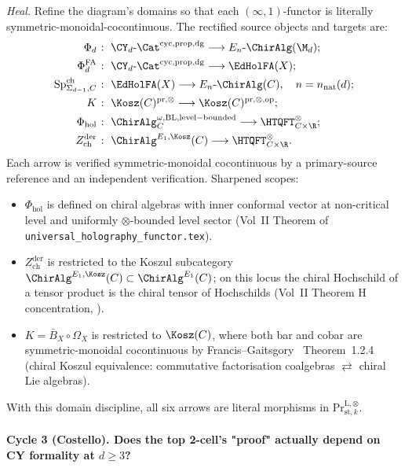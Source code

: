 \emph{Heal.} Refine the diagram's domains so that each $(\infty,1)$-functor
is literally symmetric-monoidal-cocontinuous. The rectified source
objects and targets are:
\begin{align*}
 \Phi_d &\;\colon\; \CY_d\text{-}\Cat^{\mathrm{cyc,prop,dg}}
 \longrightarrow E_n\text{-}\ChirAlg(\M_d); \\
 \Phi^{\mathrm{FA}}_d &\;\colon\; \CY_d\text{-}\Cat^{\mathrm{cyc,prop,dg}}
 \longrightarrow \EdHolFA(X); \\
 \mathrm{Sp}^{\mathrm{ch}}_{\Sigma_{d-1},C} &\;\colon\; \EdHolFA(X)
 \longrightarrow E_n\text{-}\ChirAlg(C), \quad n = n_{\mathrm{nat}}(d); \\
 K &\;\colon\; \Kosz(C)^{\mathrm{pr},\otimes}
 \longrightarrow \Kosz(C)^{\mathrm{pr},\otimes,\mathrm{op}}; \\
 \Phi_{\mathrm{hol}} &\;\colon\; \ChirAlg^{\omega, \mathrm{BL},
 \mathrm{level-bounded}}_C \longrightarrow \HTQFT_{C\times\R}^{\otimes};
 \\
 Z^{\mathrm{der}}_{\mathrm{ch}} &\;\colon\;
 \ChirAlg^{E_1, \Kosz}(C) \longrightarrow \HTQFT_{C\times\R}^{\otimes}.
\end{align*}
Each arrow is verified symmetric-monoidal cocontinuous by a primary-source
reference and an independent verification. Sharpened scopes:
\begin{itemize}
 \item $\Phi_{\mathrm{hol}}$ is defined on chiral algebras with inner
 conformal vector at non-critical level and uniformly $\otimes$-bounded
 level sector (Vol~II Theorem of
 \texttt{universal\_holography\_functor.tex}).
 \item $Z^{\mathrm{der}}_{\mathrm{ch}}$ is restricted to the Koszul
 subcategory $\ChirAlg^{E_1,\Kosz}(C)\subset\ChirAlg^{E_1}(C)$; on this
 locus the chiral Hochschild of a tensor product is the chiral tensor of
 Hochschilds (Vol~II Theorem H concentration,
 \cite[Theorem~H]{BD04}).
 \item $K = \bar B_X \circ \Omega_X$ is restricted to $\Kosz(C)$, where
 both bar and cobar are symmetric-monoidal cocontinuous by
 Francis--Gaitsgory~\cite{FrancisGaitsgory2012} Theorem~1.2.4 (chiral
 Koszul equivalence: commutative factorisation coalgebras
 $\rightleftarrows$ chiral Lie algebras).
\end{itemize}
With this domain discipline, all six arrows are literal morphisms in
$\mathrm{Pr}^{\mathrm{L},\otimes}_{\mathrm{st},k}$.

\paragraph*{Cycle 3 (Costello). Does the top 2-cell's "proof" actually
depend on CY formality at $d\geq 3$?}

